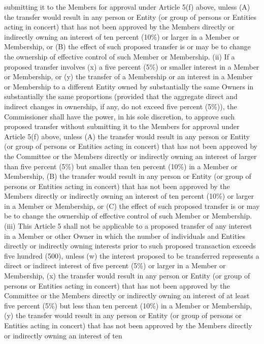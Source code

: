 \documentclass[]{book}
\theoremstyle{definition}
\theoremstyle{definition}
\theoremstyle{definition}
\theoremstyle{remark}
\begin{document}
submitting it to the Members for approval under Article 5(f) above,
unless (A) the transfer would result in any person or Entity (or group
of persons or Entities acting in concert) that has not been approved by
the Members directly or indirectly owning an interest of ten percent
(10\%) or larger in a Member or Membership, or (B) the effect of such
proposed transfer is or may be to change the ownership of effective
control of such Member or Membership. (ii) If a proposed transfer
involves (x) a five percent (5\%) or smaller interest in a Member or
Membership, or (y) the transfer of a Membership or an interest in a
Member or Membership to a different Entity owned by substantially the
same Owners in substantially the same proportions (provided that the
aggregate direct and indirect changes in ownership, if any, do not
exceed five percent (5\%)), the Commissioner shall have the power, in
his sole discretion, to approve such proposed transfer without
submitting it to the Members for approval under Article 5(f) above,
unless (A) the transfer would result in any person or Entity (or group
of persons or Entities acting in concert) that has not been approved by
the Committee or the Members directly or indirectly owning an interest
of larger than five percent (5\%) but smaller than ten percent (10\%) in
a Member or Membership, (B) the transfer would result in any person or
Entity (or group of persons or Entities acting in concert) that has not
been approved by the Members directly or indirectly owning an interest
of ten percent (10\%) or larger in a Member or Membership, or (C) the
effect of such proposed transfer is or may be to change the ownership of
effective control of such Member or Membership. (iii) This Article 5
shall not be applicable to a proposed transfer of any interest in a
Member or other Owner in which the number of individuals and Entities
directly or indirectly owning interests prior to such proposed
transaction exceeds five hundred (500), unless (w) the interest proposed
to be transferred represents a direct or indirect interest of five
percent (5\%) or larger in a Member or Membership, (x) the transfer
would result in any person or Entity (or group of persons or Entities
acting in concert) that has not been approved by the Committee or the
Members directly or indirectly owning an interest of at least five
percent (5\%) but less than ten percent (10\%) in a Member or
Membership, (y) the transfer would result in any person or Entity (or
group of persons or Entities acting in concert) that has not been
approved by the Members directly or indirectly owning an interest of ten
\end{document}
